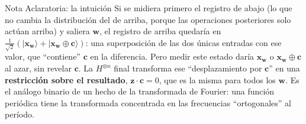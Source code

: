 \documentclass[11pt, a4paper, twoside, openright]{report}
\providecommand{\ket}[1]{|#1\rangle}
\newcommand{\bx}{\mathbf{x}}
\newcommand{\bz}{\mathbf{z}}
\newcommand{\bc}{\mathbf{c}}
\newcommand{\bw}{\mathbf{w}}
\begin{document}
\begin{aclaracion}{Nota Aclaratoria: la intuición}
Si se midiera primero el registro de abajo (lo que no cambia la distribución del de arriba, porque las operaciones posteriores solo actúan arriba) y saliera $\bw$, el registro de arriba quedaría en $\frac{1}{\sqrt2}(\ket{\bx_{\bw}} + \ket{\bx_{\bw}\oplus\bc})$: una superposición de las dos únicas entradas con ese valor, que ``contiene'' $\bc$ en la diferencia. Pero medir este estado daría $\bx_{\bw}$ o $\bx_{\bw}\oplus\bc$ al azar, sin revelar $\bc$. La $H^{\otimes n}$ final transforma ese ``desplazamiento por $\bc$'' en una \textbf{restricción sobre el resultado}, $\bz\cdot\bc = 0$, que es la misma para todos los $\bw$. Es el análogo binario de un hecho de la transformada de Fourier: una función periódica tiene la transformada concentrada en las frecuencias ``ortogonales'' al período.
\end{aclaracion}
\end{document}
